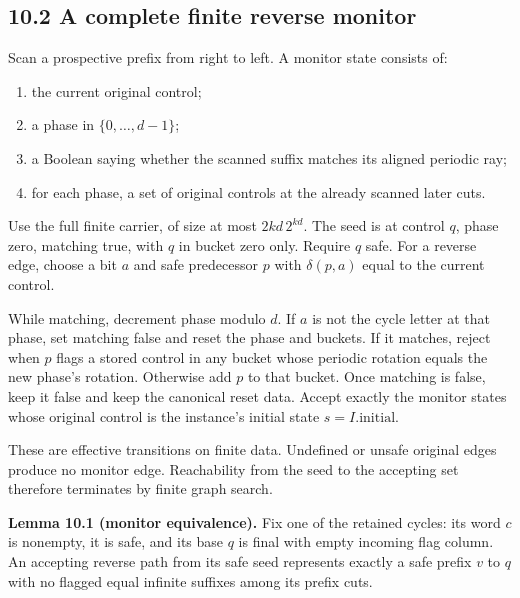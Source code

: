 \documentclass[
  11pt,
  a4paper,
]{article}
\newcounter{none} %
\providecommand{\tightlist}{%
  \setlength{\itemsep}{0pt}\setlength{\parskip}{0pt}}
\begin{document}
\subsection{10.2 A complete finite reverse
monitor}\label{a-complete-finite-reverse-monitor}

Scan a prospective prefix from right to left. A monitor state consists
of:

\begin{enumerate}
\def\labelenumi{\arabic{enumi}.}
\tightlist
\item
  the current original control;
\item
  a phase in \(\{0,\ldots,d-1\}\);
\item
  a Boolean saying whether the scanned suffix matches its aligned
  periodic ray;
\item
  for each phase, a set of original controls at the already scanned
  later cuts.
\end{enumerate}

Use the full finite carrier, of size at most \(2kd\,2^{kd}\). The seed
is at control \(q\), phase zero, matching true, with \(q\) in bucket
zero only. Require \(q\) safe. For a reverse edge, choose a bit \(a\)
and safe predecessor \(p\) with \(\delta(p,a)\) equal to the current
control.

While matching, decrement phase modulo \(d\). If \(a\) is not the cycle
letter at that phase, set matching false and reset the phase and
buckets. If it matches, reject when \(p\) flags a stored control in any
bucket whose periodic rotation equals the new phase's rotation.
Otherwise add \(p\) to that bucket. Once matching is false, keep it
false and keep the canonical reset data. Accept exactly the monitor
states whose original control is the instance's initial state
\(s=I.\mathrm{initial}\).

These are effective transitions on finite data. Undefined or unsafe
original edges produce no monitor edge. Reachability from the seed to
the accepting set therefore terminates by finite graph search.


\textbf{Lemma 10.1 (monitor equivalence).} Fix one of the retained
cycles: its word \(c\) is nonempty, it is safe, and its base \(q\) is
final with empty incoming flag column. An accepting reverse path from
its safe seed represents exactly a safe prefix \(v\) to \(q\) with no
flagged equal infinite suffixes among its prefix cuts.
\end{document}
